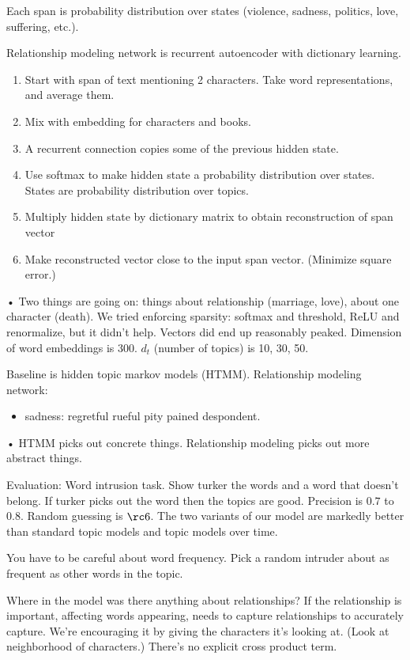 Each span is probability distribution over states (violence, sadness, politics, love, suffering, etc.). 

Relationship modeling network is recurrent autoencoder with dictionary learning. 
\begin{enumerate}
\item
Start with span of text mentioning 2 characters. Take word representations, and average them. %
\item
Mix with embedding for characters and books.
\item
A recurrent connection copies some of the previous hidden state.
\item
Use softmax to make hidden state a probability distribution over states.
States are probability distribution over topics. 
\item
Multiply hidden state by dictionary matrix to obtain reconstruction of span vector
\item
Make reconstructed vector close to the input span vector. (Minimize square error.)
\end{enumerate}•
Two things are going on: things about relationship (marriage, love), about one character (death). 
We tried enforcing sparsity: softmax and threshold, ReLU and renormalize, but it didn't help. Vectors did end up reasonably peaked.
Dimension of word embeddings is 300. $d_t$ (number of topics) is 10, 30, 50.

Baseline is hidden topic markov models (HTMM). Relationship modeling network:
\begin{itemize}
\item
sadness: regretful rueful pity pained despondent.
\end{itemize}•
HTMM picks out concrete things. Relationship modeling picks out more abstract things.

Evaluation: Word intrusion task. Show turker the words and a word that doesn't belong. If turker picks out the word then the topics are good.
Precision is $0.7$ to $0.8$. Random guessing is $\rc 6$. The two variants of our model are markedly better than standard topic models and topic models over time.

You have to be careful about word frequency. Pick a random intruder about as frequent as other words in the topic.

Where in the model was there anything about relationships?
If the relationship is important, affecting words appearing, needs to capture relationships to accurately capture. We're encouraging it by giving the characters it's looking at.  (Look at neighborhood of characters.) There's no explicit cross product term. 

